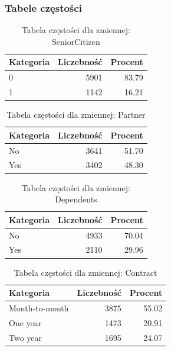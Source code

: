 \documentclass[12pt, a4paper]{article}\usepackage[]{graphicx}\usepackage[]{xcolor}
\begin{document}
\subsubsection{Tabele częstości}
\begin{table}[ht]
\centering
\caption{Tabela częstości dla zmiennej: SeniorCitizen} 
\label{tab:czest_SeniorCitizen}
\begin{tabular}{lrr}
  \hline
Kategoria & Liczebność & Procent \\ 
  \hline
0 & 5901 & 83.79 \\ 
  1 & 1142 & 16.21 \\ 
   \hline
\end{tabular}
\end{table}
\begin{table}[ht]
\centering
\caption{Tabela częstości dla zmiennej: Partner} 
\label{tab:czest_Partner}
\begin{tabular}{lrr}
  \hline
Kategoria & Liczebność & Procent \\ 
  \hline
No & 3641 & 51.70 \\ 
  Yes & 3402 & 48.30 \\ 
   \hline
\end{tabular}
\end{table}
\begin{table}[ht]
\centering
\caption{Tabela częstości dla zmiennej: Dependents} 
\label{tab:czest_Dependents}
\begin{tabular}{lrr}
  \hline
Kategoria & Liczebność & Procent \\ 
  \hline
No & 4933 & 70.04 \\ 
  Yes & 2110 & 29.96 \\ 
   \hline
\end{tabular}
\end{table}
\begin{table}[ht]
\centering
\caption{Tabela częstości dla zmiennej: Contract} 
\label{tab:czest_Contract}
\begin{tabular}{lrr}
  \hline
Kategoria & Liczebność & Procent \\ 
  \hline
Month-to-month & 3875 & 55.02 \\ 
  One year & 1473 & 20.91 \\ 
  Two year & 1695 & 24.07 \\ 
   \hline
\end{tabular}
\end{table}
\end{document}
